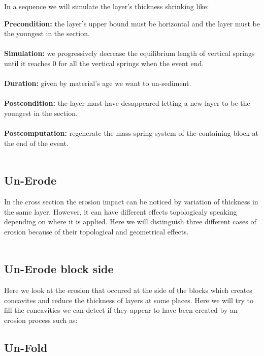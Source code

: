 \documentclass[12pt, a4paper]{memoir} %
\begin{document}
In a sequence we will simulate the layer's thickness shrinking like:


\textbf{Precondition:} the layer's upper bound must be horizontal and the layer must be the youngest in the section.\\\\
\textbf{Simulation:} we progressively decrease the equilibrium length of vertical springs until it reaches $0$ for all the vertical springs when the event end.\\\\
\textbf{Duration:} given by material's age we want to un-sediment.\\\\
\textbf{Postcondition:} the layer must have desappeared letting a new layer to be the youngest 
in the section.\\\\

\textbf{Postcomputation:} regenerate the mass-spring system of the containing block at the end of the event.\\\\

\subsection{Un-Erode}

In the cross section the erosion impact can be noticed by variation of thickness in the same layer. However, it can have different effects topologicaly speaking depending on where it is applied. Here we will distinguish three different cases of erosion because of their topological and geometrical effects.\\\\

\subsection{Un-Erode block side}

Here we look at the erosion that occured at the side of the blocks which creates concavites and reduce the thickness of layers at some places. Here we will try to fill the concavities we can detect if they appear to have been created by an erosion process such as:


\subsection{Un-Fold}
\end{document}
